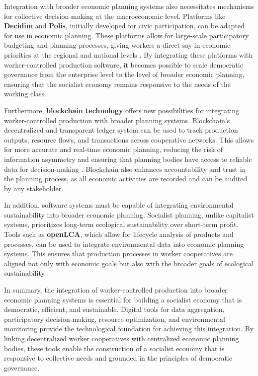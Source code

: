 \begin{refsection}
Integration with broader economic planning systems also necessitates mechanisms for collective decision-making at the macroeconomic level. Platforms like \textbf{Decidim} and \textbf{Polis}, initially developed for civic participation, can be adapted for use in economic planning. These platforms allow for large-scale participatory budgeting and planning processes, giving workers a direct say in economic priorities at the regional and national levels \cite[pp.~113-118]{landemore2022}. By integrating these platforms with worker-controlled production software, it becomes possible to scale democratic governance from the enterprise level to the level of broader economic planning, ensuring that the socialist economy remains responsive to the needs of the working class.

Furthermore, \textbf{blockchain technology} offers new possibilities for integrating worker-controlled production with broader planning systems. Blockchain’s decentralized and transparent ledger system can be used to track production outputs, resource flows, and transactions across cooperative networks. This allows for more accurate and real-time economic planning, reducing the risk of information asymmetry and ensuring that planning bodies have access to reliable data for decision-making \cite[pp.~137-140]{tapscott2016}. Blockchain also enhances accountability and trust in the planning process, as all economic activities are recorded and can be audited by any stakeholder.

In addition, software systems must be capable of integrating environmental sustainability into broader economic planning. Socialist planning, unlike capitalist systems, prioritizes long-term ecological sustainability over short-term profit. Tools such as \textbf{openLCA}, which allow for lifecycle analysis of products and processes, can be used to integrate environmental data into economic planning systems. This ensures that production processes in worker cooperatives are aligned not only with economic goals but also with the broader goals of ecological sustainability \cite[pp.~214-217]{wright2010}.

In summary, the integration of worker-controlled production into broader economic planning systems is essential for building a socialist economy that is democratic, efficient, and sustainable. Digital tools for data aggregation, participatory decision-making, resource optimization, and environmental monitoring provide the technological foundation for achieving this integration. By linking decentralized worker cooperatives with centralized economic planning bodies, these tools enable the construction of a socialist economy that is responsive to collective needs and grounded in the principles of democratic governance.


\end{refsection}
